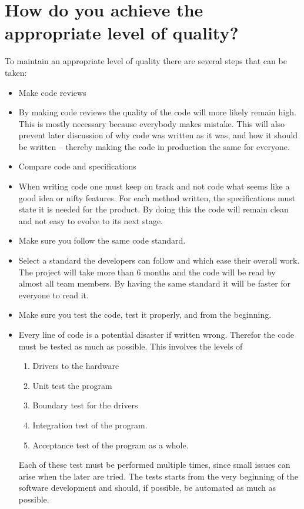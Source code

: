 \documentclass[Main]{subfiles}
\begin{document}
\section{How do you achieve the appropriate level of quality?}

To maintain an appropriate level of quality there are several steps that can be taken:

\begin{itemize}
	\item Make code reviews
	\item[] By making code reviews the quality of the code will more likely remain high.
	This is mostly necessary because everybody makes mistake.
	This will also prevent later discussion of why code was written as it was, and how it should be written -- thereby making the code in production the same for everyone.

	\item Compare code and specifications
	\item[] When writing code one must keep on track and not code what seems like a good idea or nifty features.
	For each method written, the specifications must state it is needed for the product.
	By doing this the code will remain clean and not easy to evolve to its next stage.


	\item Make sure you follow the same code standard.
	\item[] Select a standard the developers can follow and which ease their overall work. 
	The project will take more than 6 months and the code will be read by almost all team members.
	By having the same standard it will be faster for everyone to read it.

	\item Make sure you test the code, test it properly, and from the beginning.
	\item[] Every line of code is a potential disaster if written wrong.
	Therefor the code must be tested as much as possible. 
	This involves the levels of
	\begin{enumerate}
		\item Drivers to the hardware
		\item Unit test the program
		\item Boundary test for the drivers
		\item Integration test of the program.
		\item Acceptance test of the program as a whole.
	\end{enumerate}
	Each of these test must be performed multiple times, since small issues can arise when the later are tried.
	The tests starts from the very beginning of the software development and should, if possible, be automated as much as possible.


\end{itemize}
\end{document}
